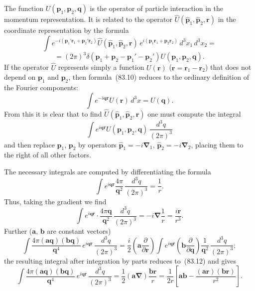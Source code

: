 The function $U(\mathbf{p}_1, \mathbf{p}_2, \mathbf{q})$ is the operator of particle interaction in the momentum representation. It is related to the operator $\hat{U}(\hat{\mathbf{p}}_1, \hat{\mathbf{p}}_2, \mathbf{r})$ in the coordinate representation by the formula
\begin{equation}
\int e^{-i(\mathbf{p}_1'\mathbf{r}_1+\mathbf{p}_2'\mathbf{r}_2)}\hat{U}(\hat{\mathbf{p}}_1,\hat{\mathbf{p}}_2,\mathbf{r})\,e^{i(\mathbf{p}_1\mathbf{r}_1+\mathbf{p}_2\mathbf{r}_2)}\,d^3x_1\,d^3x_2 =
\end{equation}
\[
= (2\pi)^3\delta(\mathbf{p}_1+\mathbf{p}_2-\mathbf{p}_1'-\mathbf{p}_2')U(\mathbf{p}_1,\mathbf{p}_2,\mathbf{q}).
\tag{83.10}
\]
If the operator $\hat{U}$ represents simply a function $U(\mathbf{r})$ ($\mathbf{r} = \mathbf{r}_1 - \mathbf{r}_2$) that does not depend on $\mathbf{p}_1$ and $\mathbf{p}_2$, then formula~(83.10) reduces to the ordinary definition of the Fourier components:
\[
\int e^{-i\mathbf{qr}}U(\mathbf{r})\,d^3x = U(\mathbf{q}).
\]
From this it is clear that to find $\hat{U}(\hat{\mathbf{p}}_1, \hat{\mathbf{p}}_2, \mathbf{r})$ one must compute the integral
\[
\int e^{i\mathbf{qr}}U(\mathbf{p}_1, \mathbf{p}_2, \mathbf{q})\,\frac{d^3q}{(2\pi)^3}
\]
and then replace $\mathbf{p}_1$, $\mathbf{p}_2$ by operators $\hat{\mathbf{p}}_1 = -i\boldsymbol{\nabla}_1$, $\hat{\mathbf{p}}_2 = -i\boldsymbol{\nabla}_2$, placing them to the right of all other factors.

The necessary integrals are computed by differentiating the formula
\begin{equation}
\int e^{i\mathbf{qr}}\frac{4\pi}{\mathbf{q}^2}\,\frac{d^3q}{(2\pi)^3} = \frac{1}{r}.
\tag{83.11}
\end{equation}
Thus, taking the gradient we find
\begin{equation}
\int e^{i\mathbf{qr}}\cdot\frac{4\pi\mathbf{q}}{\mathbf{q}^2}\,\frac{d^3q}{(2\pi)^3} = -i\boldsymbol{\nabla}\frac{1}{r} = \frac{i\mathbf{r}}{r^3}.
\tag{83.12}
\end{equation}
Further ($\mathbf{a}$, $\mathbf{b}$ are constant vectors)
\begin{equation}
\int\frac{4\pi(\mathbf{aq})(\mathbf{bq})}{\mathbf{q}^4}\,e^{i\mathbf{qr}}\,\frac{d^3q}{(2\pi)^3} = \frac{i}{2}\left(\mathbf{a}\frac{\partial}{\partial\mathbf{r}}\right)\int e^{i\mathbf{qr}}\left(\mathbf{b}\frac{\partial}{\partial\mathbf{q}}\right)\frac{1}{\mathbf{q}^2}\,\frac{d^3q}{(2\pi)^3};
\tag{83.13}
\end{equation}
the resulting integral after integration by parts reduces to~(83.12) and gives
\[
\int\frac{4\pi(\mathbf{aq})(\mathbf{bq})}{\mathbf{q}^4}\,e^{i\mathbf{qr}}\,\frac{d^3q}{(2\pi)^3} = \frac{1}{2}(\mathbf{a}\boldsymbol{\nabla})\frac{\mathbf{br}}{r} = \frac{1}{2r}\left[\mathbf{ab}-\frac{(\mathbf{ar})(\mathbf{br})}{r^2}\right].
\]

